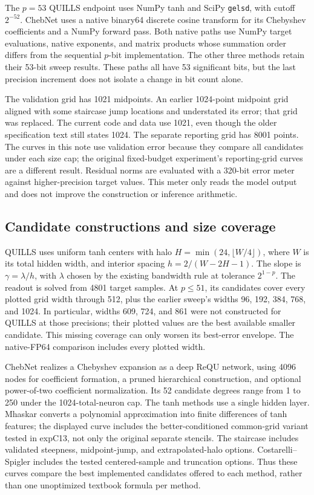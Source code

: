 \documentclass[11pt]{article}
\begin{document}
The \(p=53\) QUILLS endpoint uses NumPy tanh and SciPy \texttt{gelsd}, with cutoff \(2^{-52}\). ChebNet uses a native binary64 discrete cosine transform for its Chebyshev coefficients and a NumPy forward pass. Both native paths use NumPy target evaluations, native exponents, and matrix products whose summation order differs from the sequential \(p\)-bit implementation. The other three methods retain their 53-bit sweep results. These paths all have 53 significant bits, but the last precision increment does not isolate a change in bit count alone.

The validation grid has 1021 midpoints. An earlier 1024-point midpoint grid aligned with some staircase jump locations and understated its error; that grid was replaced. The current code and data use 1021, even though the older specification text still states 1024. The separate reporting grid has 8001 points. The curves in this note use validation error because they compare all candidates under each size cap; the original fixed-budget experiment's reporting-grid curves are a different result. Residual norms are evaluated with a 320-bit error meter against higher-precision target values. This meter only reads the model output and does not improve the construction or inference arithmetic.

\subsection{Candidate constructions and size coverage}
QUILLS uses uniform tanh centers with halo \(H=\min(24,\lfloor W/4\rfloor)\), where \(W\) is its total hidden width, and interior spacing \(h=2/(W-2H-1)\). The slope is \(\gamma=\lambda/h\), with \(\lambda\) chosen by the existing bandwidth rule at tolerance \(2^{1-p}\). The readout is solved from 4801 target samples. At \(p\le51\), its candidates cover every plotted grid width through 512, plus the earlier sweep's widths 96, 192, 384, 768, and 1024. In particular, widths 609, 724, and 861 were not constructed for QUILLS at those precisions; their plotted values are the best available smaller candidate. This missing coverage can only worsen its best-error envelope. The native-FP64 comparison includes every plotted width.

ChebNet realizes a Chebyshev expansion as a deep ReQU network, using 4096 nodes for coefficient formation, a pruned hierarchical construction, and optional power-of-two coefficient normalization. Its 52 candidate degrees range from 1 to 250 under the 1024-total-neuron cap. The tanh methods use a single hidden layer. Mhaskar converts a polynomial approximation into finite differences of tanh features; the displayed curve includes the better-conditioned common-grid variant tested in expC13, not only the original separate stencils. The staircase includes validated steepness, midpoint-jump, and extrapolated-halo options. Costarelli--Spigler includes the tested centered-sample and truncation options. Thus these curves compare the best implemented candidates offered to each method, rather than one unoptimized textbook formula per method.
\end{document}
